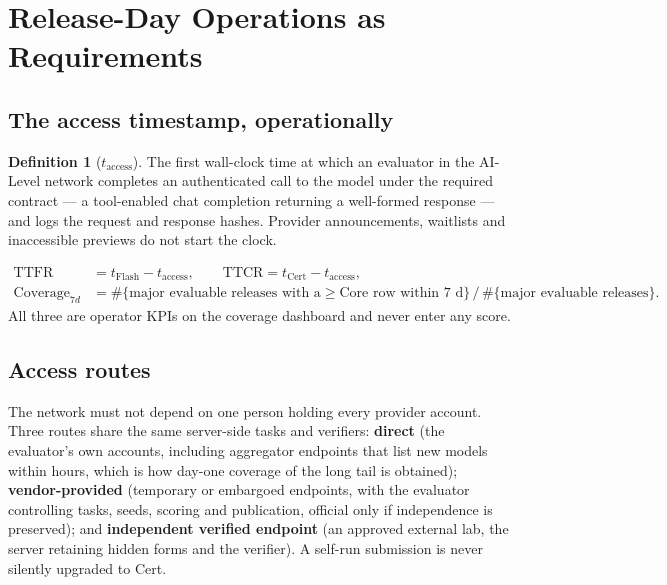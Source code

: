 \documentclass[11pt]{article}
\theoremstyle{definition}
\newtheorem{definition}{Definition}
\begin{document}
\section{Release-Day Operations as Requirements}\label{sec:ops}

\subsection{The access timestamp, operationally}
\begin{definition}[$t_{\text{access}}$]
The first wall-clock time at which an evaluator in the AI-Level network completes an authenticated call to the model under the required contract --- a tool-enabled chat completion returning a well-formed response --- and logs the request and response hashes. Provider announcements, waitlists and inaccessible previews do not start the clock.
\end{definition}
\begin{align*}
\mathrm{TTFR} &= t_{\mathrm{Flash}} - t_{\text{access}}, \qquad \mathrm{TTCR} = t_{\mathrm{Cert}} - t_{\text{access}},\\
\mathrm{Coverage}_{7d} &= \#\{\text{major evaluable releases with a} \ge \text{Core row within 7 d}\} \,/\, \#\{\text{major evaluable releases}\}.
\end{align*}
All three are operator KPIs on the coverage dashboard and never enter any score.

\subsection{Access routes}
The network must not depend on one person holding every provider account. Three routes share the same server-side tasks and verifiers: \textbf{direct} (the evaluator's own accounts, including aggregator endpoints that list new models within hours, which is how day-one coverage of the long tail is obtained); \textbf{vendor-provided} (temporary or embargoed endpoints, with the evaluator controlling tasks, seeds, scoring and publication, official only if independence is preserved); and \textbf{independent verified endpoint} (an approved external lab, the server retaining hidden forms and the verifier). A self-run submission is never silently upgraded to Cert.
\end{document}
